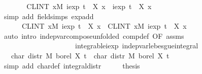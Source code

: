 {\ \ \isamarkupfalse%
\ \isamarkupfalse%
\ {\isachardoublequoteopen}{\isasymdots}\ {\isacharequal}\ {\isacharparenleft}CLINT\ x{\isacharbar}M{\isachardot}\ iexp\ {\isacharparenleft}t\ {\isacharasterisk}\ {\isacharparenleft}X{}\ x{\isacharparenright}{\isacharparenright}\ {\isacharasterisk}\ iexp\ {\isacharparenleft}t\ {\isacharasterisk}\ {\isacharparenleft}X{}\ x{\isacharparenright}{\isacharparenright}{\isacharparenright}{\isachardoublequoteclose}\isanewline
\ \ \ \ \isamarkupfalse%
\ {\isacharparenleft}simp\ add{\isacharcolon}\ field{\isacharunderscore}simps\ exp{\isacharunderscore}add{\isacharparenright}\isanewline
\ \ \isamarkupfalse%
\ \isamarkupfalse%
\ {\isachardoublequoteopen}{\isasymdots}\ {\isacharequal}\isanewline
\ \ \ \ \ \ {\isacharparenleft}CLINT\ x{\isacharbar}M{\isachardot}\ iexp\ {\isacharparenleft}t\ {\isacharasterisk}\ {\isacharparenleft}X{}\ x{\isacharparenright}{\isacharparenright}{\isacharparenright}\ {\isacharasterisk}\ {\isacharparenleft}CLINT\ x{\isacharbar}M{\isachardot}\ iexp\ {\isacharparenleft}t\ {\isacharasterisk}\ {\isacharparenleft}X{}\ x{\isacharparenright}{\isacharparenright}{\isacharparenright}{\isachardoublequoteclose}\isanewline
\ \ \ \ \isamarkupfalse%
\ {\isacharparenleft}auto\ intro{\isacharbang}{\isacharcolon}\ indep{\isacharunderscore}var{\isacharunderscore}compose{\isacharbrackleft}unfolded\ comp{\isacharunderscore}def{\isacharcomma}\ OF\ assms{\isacharbrackright}\isanewline
\ \ \ \ \ \ \ \ \ \ \ \ \ \ \ \ \ \ \ \ \ integrable{\isacharunderscore}iexp\ indep{\isacharunderscore}var{\isacharunderscore}lebesgue{\isacharunderscore}integral{\isacharparenright}\isanewline
\ \ \isamarkupfalse%
\ \isamarkupfalse%
\ {\isachardoublequoteopen}{\isasymdots}\ {\isacharequal}\ char\ {\isacharparenleft}distr\ M\ borel\ X{}{\isacharparenright}\ t\ {\isacharasterisk}\ char\ {\isacharparenleft}distr\ M\ borel\ X{}{\isacharparenright}\ t{\isachardoublequoteclose}\isanewline
\ \ \ \ \isamarkupfalse%
\ {\isacharparenleft}simp\ add{\isacharcolon}\ char{\isacharunderscore}def\ integral{\isacharunderscore}distr{\isacharparenright}\isanewline
\ \ \isamarkupfalse%
\ \isamarkupfalse%
\ {\isacharquery}thesis\ \isacommand{{\isachardot}}\isamarkupfalse%
\isanewline
{}\isamarkupfalse%
%
\endisatagproof
{\isafoldproof}%
%
\isadelimproof
%
\endisadelimproof
%
}%
